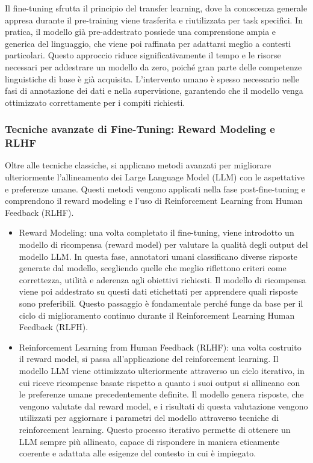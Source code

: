 \documentclass[target=mst,aauheader=,style=]{thud}
\begin{document}
Il fine-tuning sfrutta il principio del transfer learning, dove la conoscenza generale appresa durante il pre-training viene trasferita e riutilizzata per task specifici. In pratica, il modello già pre-addestrato possiede una comprensione ampia e generica del linguaggio, che viene poi raffinata per adattarsi meglio a contesti particolari. Questo approccio riduce significativamente il tempo e le risorse necessari per addestrare un modello da zero, poiché gran parte delle competenze linguistiche di base è già acquisita. L'intervento umano è spesso necessario nelle fasi di annotazione dei dati e nella supervisione, garantendo che il modello venga ottimizzato correttamente per i compiti richiesti.

\subsubsection{Tecniche avanzate di Fine-Tuning: Reward Modeling e RLHF}
Oltre alle tecniche classiche, si applicano metodi avanzati per migliorare ulteriormente l’allineamento dei Large Language Model (LLM) con le aspettative e preferenze umane. Questi metodi vengono applicati nella fase post-fine-tuning e comprendono il reward modeling e l’uso di Reinforcement Learning from Human Feedback (RLHF).

\begin{itemize}
    \item Reward Modeling: una volta completato il fine-tuning, viene introdotto un modello di ricompensa (reward model) per valutare la qualità degli output del modello LLM. In questa fase, annotatori umani classificano diverse risposte generate dal modello, scegliendo quelle che meglio riflettono criteri come correttezza, utilità e aderenza agli obiettivi richiesti. Il modello di ricompensa viene poi addestrato su questi dati etichettati per apprendere quali risposte sono preferibili. Questo passaggio è fondamentale perché funge da base per il ciclo di miglioramento continuo durante il Reinforcement Learning Human Feedback (RLFH).
    \item Reinforcement Learning from Human Feedback (RLHF): una volta costruito il reward model, si passa all’applicazione del reinforcement learning. Il modello LLM viene ottimizzato ulteriormente attraverso un ciclo iterativo, in cui riceve ricompense basate rispetto a quanto i suoi output si allineano con le preferenze umane precedentemente definite. Il modello genera risposte, che vengono valutate dal reward model, e i risultati di questa valutazione vengono utilizzati per aggiornare i parametri del modello attraverso tecniche di reinforcement learning. Questo processo iterativo permette di ottenere un LLM sempre più allineato, capace di rispondere in maniera eticamente coerente e adattata alle esigenze del contesto in cui è impiegato.
\end{itemize}
\end{document}
